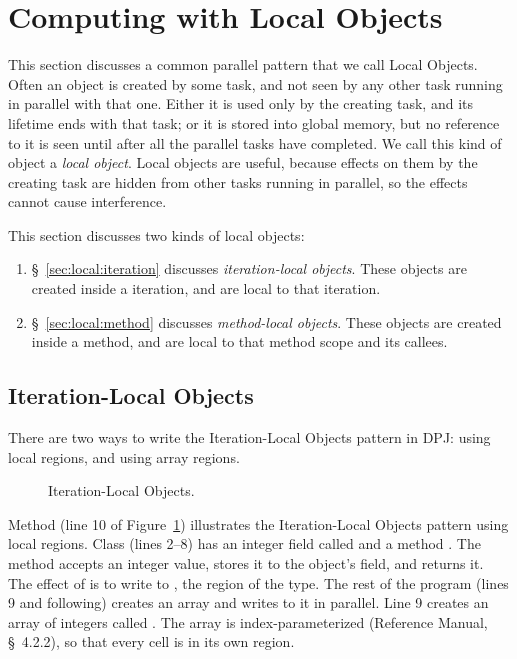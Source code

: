 \section{Computing with Local Objects%
\label{sec:local}}

This section discusses a common parallel pattern that we call Local
Objects.  Often an object is created by some task, and not seen by any
other task running in parallel with that one.  Either it is used only
by the creating task, and its lifetime ends with that task; or it is
stored into global memory, but no reference to it is seen until after
all the parallel tasks have completed.  We call this kind of object a
\emph{local object}.  Local objects are useful, because effects on
them by the creating task are hidden from other tasks running in
parallel, so the effects cannot cause interference.

This section discusses two kinds of local objects:
%
\begin{enumerate}
%
\item \S~\ref{sec:local:iteration} discusses \emph{iteration-local
  objects}.  These objects are created inside a 
  iteration, and are local to that iteration.
%
\item \S~\ref{sec:local:method} discusses \emph{method-local objects}.
  These objects are created inside a method, and are local to that
  method scope and its callees.
%
\end{enumerate}
%


\subsection{Iteration-Local Objects%
\label{sec:local:iteration}}

There are two ways to write the Iteration-Local Objects pattern in
DPJ: using local regions, and using array regions.

\begin{figure}

\caption{Iteration-Local Objects.}
\label{fig:local:iteration:pattern}
\end{figure}

 Method
 (line 10 of
Figure~\ref{fig:local:iteration:pattern}) illustrates the
Iteration-Local Objects pattern using local regions.  Class
 (lines 2--8) has an integer field called 
and a method .  The  method
accepts an integer value, stores it to the object's  field,
and returns it.  The effect of  is to write to
, the region of the  type.  The rest of the
program (lines 9 and following) creates an array and writes to it in
parallel.  Line 9 creates an array of integers called .
The array is index-parameterized (Reference Manual, \S~4.2.2), so that
every cell is in its own region.

